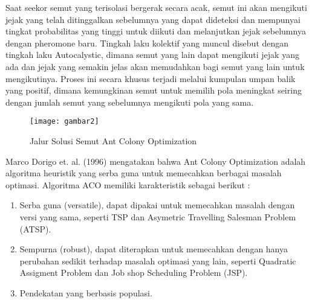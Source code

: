Saat seekor semut yang terisolasi bergerak secara acak, semut ini akan mengikuti jejak yang telah ditinggalkan sebelumnya yang dapat dideteksi dan mempunyai tingkat probabilitas yang tinggi untuk diikuti dan melanjutkan jejak sebelumnya dengan pheromone baru. Tingkah laku kolektif yang muncul disebut dengan tingkah laku Autocalystic, dimana semut yang lain dapat mengikuti jejak yang ada dan jejak yang semakin jelas akan memudahkan bagi semut yang lain untuk mengikutinya. Proses ini secara khusus terjadi melalui kumpulan umpan balik yang positif, dimana kemungkinan semut untuk memilih pola meningkat seiring dengan jumlah semut yang sebelumnya mengikuti pola yang sama.
\begin{figure}[H]
	\centering
	\texttt{[image: gambar2]}
	\caption[Jalur Solusi Semut] {Jalur Solusi Semut Ant Colony Optimization}
	\label{fig:JaluSolusiSemut}
\end{figure}
Marco Dorigo et. al. (1996) mengatakan bahwa Ant Colony Optimization adalah algoritma heuristik yang serba guna untuk memecahkan berbagai masalah optimasi. Algoritma ACO memiliki karakteristik sebagai berikut :
\begin{enumerate}
	\item Serba guna (versatile), dapat dipakai untuk memecahkan masalah dengan versi yang sama, seperti TSP dan Asymetric Travelling Salesman Problem (ATSP).
	\item Sempurna (robust), dapat diterapkan untuk memecahkan dengan hanya perubahan sedikit terhadap masalah optimasi yang lain, seperti Quadratic Assigment Problem dan Job shop Scheduling Problem (JSP).
	\item Pendekatan yang berbasis populasi.
\end{enumerate}

